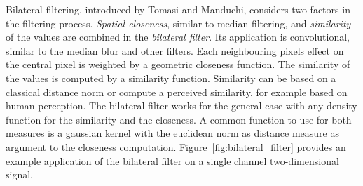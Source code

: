 Bilateral filtering, introduced by Tomasi and Manduchi\cite{tomasi_iccv98}, considers two factors in the filtering process.
\emph{Spatial closeness}, similar to median filtering, and \emph{similarity} of the values are combined in the \emph{bilateral filter}.
Its application is convolutional, similar to the median blur and other filters.
Each neighbouring pixels effect on the central pixel is weighted by a geometric closeness function.
The similarity of the values is computed by a similarity function.
Similarity can be based on a classical distance norm or compute a perceived similarity, for example based on human perception.
The bilateral filter works for the general case with any density function for the similarity and the closeness.
A common function to use for both measures is a gaussian kernel with the euclidean norm as distance measure as argument to the closeness computation.
Figure~\ref{fig:bilateral_filter} provides an example application of the bilateral filter on a single channel two-dimensional signal.
